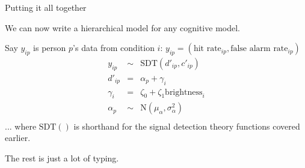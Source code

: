 \documentclass[aspectratio=169]{beamer}
\begin{document}
\begin{frame}[fragile]{Putting it all together}

    We can now write a hierarchical model for any cognitive model.\pause

    Say $y_{ip}$ is person $p$'s data from condition $i$: \pause \emph{$y_{ip} = \left(\text{hit rate}_{ip}, \text{false alarm rate}_{ip}\right)$}\pause
    \begin{eqnarray*}
        y_{ip} &\sim& \text{SDT}(d'_{ip}, c'_{ip}) \\
        d'_{ip} &=& \alpha_{p} + \gamma_{i} \\
        \gamma_{i} &=& \zeta_{0} + \zeta_{1} \text{brightness}_{i} \\
        \alpha_{p} &\sim& \text{N}(\mu_{\alpha}, \sigma^2_{\alpha}) \\
    \end{eqnarray*}
    ... where $\text{SDT}\left(\right)$ is shorthand for the signal detection theory functions covered earlier.
    \pause

    The rest is just a lot of typing.
\end{frame}
\end{document}

